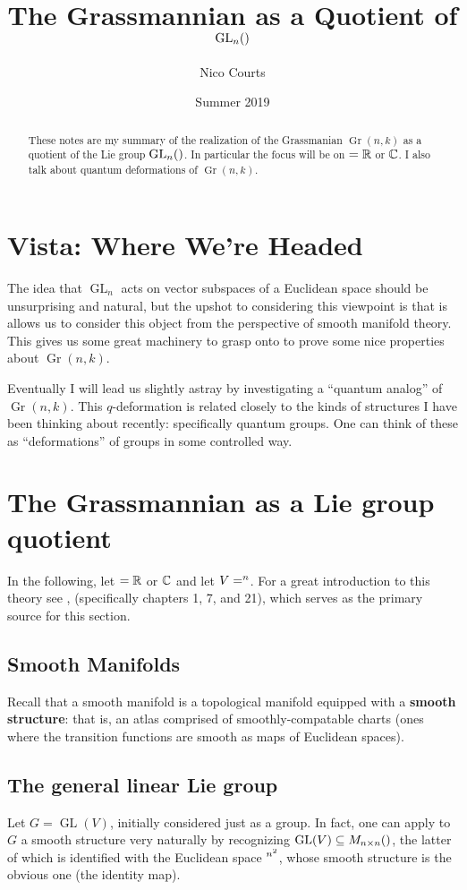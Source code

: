\documentclass[12pt]{article}
\DeclareMathOperator{\Gr}{Gr}
\DeclareMathOperator{\GL}{GL}
\let\k\relax
\newcommand{\k}{\mathbbm{k}}
\begin{document}
\title{The Grassmannian as a Quotient of $\GL_n(\k)$ \vspace{-1ex}}
\author{Nico Courts}
\date{Summer 2019}
\maketitle

\renewcommand{\abstractname}{Introduction}
\begin{abstract}
	These notes are my summary of the realization of the Grassmanian $\Gr(n,k)$ as a quotient of 
	the Lie group $\GL_n(\k)$. In particular the focus will be on $\k=\bbR$ or $\mathbb{C}$. I also talk about quantum deformations of $\Gr(n,k)$.
\end{abstract}

\section*{Vista: Where We're Headed}
The idea that $\GL_n$ acts on vector subspaces of a Euclidean space should be unsurprising and natural, but 
the upshot to considering this viewpoint is that is allows us to consider this object from the perspective of smooth 
manifold theory. This gives us some great machinery to grasp onto to prove some nice properties 
about $\Gr(n,k)$.

Eventually I will lead us slightly astray by investigating a ``quantum analog'' of $\Gr(n,k)$. This $q$-deformation
is related closely to the kinds of structures I have been thinking about recently: specifically quantum groups. One can think of 
these as ``deformations'' of groups in some controlled way.

\section{The Grassmannian as a Lie group quotient}
In the following, let $\k=\bbR$ or $\mathbb{C}$ and let $V=\k^n$. For a great introduction to this theory see \cite{LeeISM},
(specifically chapters 1, 7, and 21), which serves as the primary source for this section.
\subsection{Smooth Manifolds}
Recall that a smooth manifold is a topological manifold equipped with a \textbf{smooth structure}: that is, an atlas comprised 
of smoothly-compatable charts (ones where the transition functions are smooth as maps of Euclidean spaces).
\subsection{The general linear Lie group} 
Let $G=\GL(V)$, initially considered just as a group. In fact, one can apply to $G$ a smooth structure very naturally
by recognizing $\GL(V)\subseteq M_{n\times n}(\k)$, the latter of which is identified with the Euclidean space $\k^{n^2}$,
whose smooth structure is the obvious one (the identity map).
\end{document}
